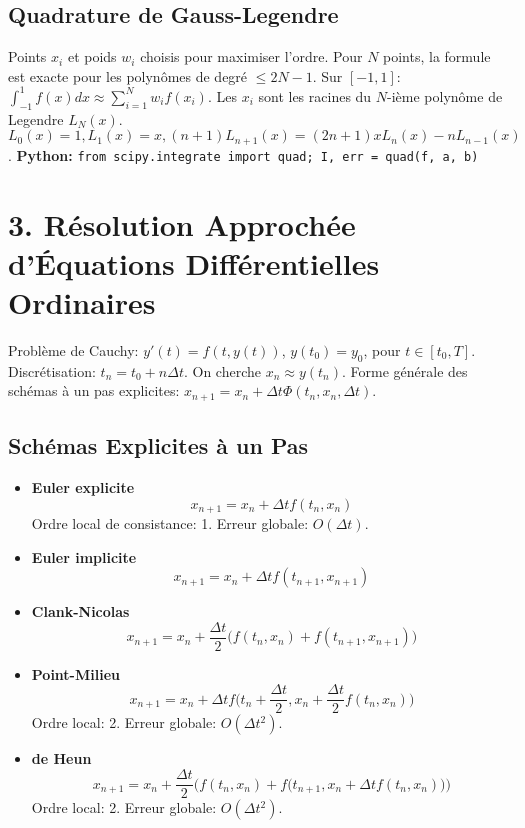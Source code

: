 \documentclass[10pt,a4paper]{article}
\newcommand{\EDO}{\text{(EDO)}}
\begin{document}
\subsection*{Quadrature de Gauss-Legendre}
Points $x_i$ et poids $w_i$ choisis pour maximiser l'ordre. Pour $N$ points, la formule est exacte pour les polynômes de degré $\le 2N-1$.
Sur $[-1,1]$: $\int_{-1}^1 f(x)dx \approx \sum_{i=1}^N w_i f(x_i)$.
Les $x_i$ sont les racines du $N$-ième polynôme de Legendre $L_N(x)$.
$L_0(x)=1, L_1(x)=x, (n+1)L_{n+1}(x) = (2n+1)xL_n(x) - nL_{n-1}(x)$.
\textbf{Python:} \texttt{from scipy.integrate import quad; I, err = quad(f, a, b)}

\newpage
\section*{3. Résolution Approchée d'Équations Différentielles Ordinaires \EDO}
Problème de Cauchy: $y'(t) = f(t, y(t))$, $y(t_0) = y_0$, pour $t \in [t_0, T]$.
Discrétisation: $t_n = t_0 + n \Delta t$. On cherche $x_n \approx y(t_n)$.
Forme générale des schémas à un pas explicites: $x_{n+1} = x_n + \Delta t \Phi(t_n, x_n, \Delta t)$.

\subsection*{Schémas Explicites à un Pas}
\begin{itemize}
    \item \textbf{Euler explicite}
        $$x_{n+1} = x_n + \Delta t f(t_n, x_n)$$ 
        Ordre local de consistance: 1. Erreur globale: $O(\Delta t)$.
    \item \textbf{Euler implicite}
        $$x_{n+1} = x_n + \Delta t f(t_{n+1}, x_{n+1})$$
    \item \textbf{Clank-Nicolas}
        $$x_{n+1} = x_n + \frac{\Delta t}{2} \big(f(t_n, x_n) + f(t_{n+1}, x_{n+1}) \big)$$
    \item \textbf{Point-Milieu}
        $$x_{n+1} = x_n + \Delta t f\big(t_{n}+\frac{\Delta t}{2}, x_{n} + \frac{\Delta t}{2} f(t_n, x_n)\big)$$
        Ordre local: 2. Erreur globale: $O(\Delta t^2)$.
    \item \textbf{de Heun}
        $$x_{n+1} = x_n + \frac{\Delta t}{2} \big(f(t_n, x_n) + f\big(t_{n+1}, x_n + \Delta t f(t_n, x_n)\big) \big)$$
        Ordre local: 2. Erreur globale: $O(\Delta t^2)$.
\end{itemize}
\end{document}

